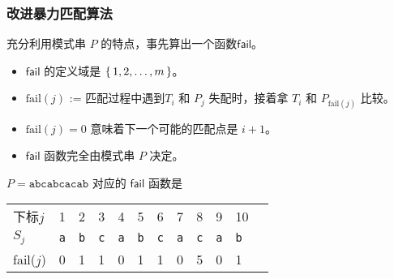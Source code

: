 \documentclass{ctexbeamer}
\newcommand{\str}[1]{\texttt{#1}}
\newcommand{\fail}{\mathsf{fail}}
\begin{document}
\begin{frame}
\frametitle{改进暴力匹配算法}
充分利用模式串 $P$ 的特点，事先算出一个函数$\fail$。

\begin{itemize}
\item $\fail$ 的定义域是 $\set{1, 2, \dots, m}$。
\item $\text{fail}(j)$ := 匹配过程中遇到$T_i$ 和 $P_j$ 失配时，接着拿 $T_i$ 和 $P_{\text{fail}(j)}$ 比较。
\item $\text{fail}(j) = 0$ 意味着下一个可能的匹配点是 $i+1$。
\item $\fail$ 函数完全由模式串 $P$ 决定。
\end{itemize}

$P=\str{abcabcacab}$ 对应的 $\fail$ 函数是

\begin{table}[]
\begin{tabular}{llllllllllll}
下标$j$ & 1  & 2  & 3 & 4 & 5 & 6 & 7 & 8 & 9 & 10 \\
$S_j$ & \str{a} & \str{b} & \str{c} & \str{a} & \str{b} & \str{c} & \str{a} & \str{c} & \str{a}  & \str{b} \\
fail($j$) & 0  & 1  & 1 & 0 & 1 & 1 & 0 & 5  & 0  & 1
\end{tabular}
\end{table}

\end{frame}
\end{document}
